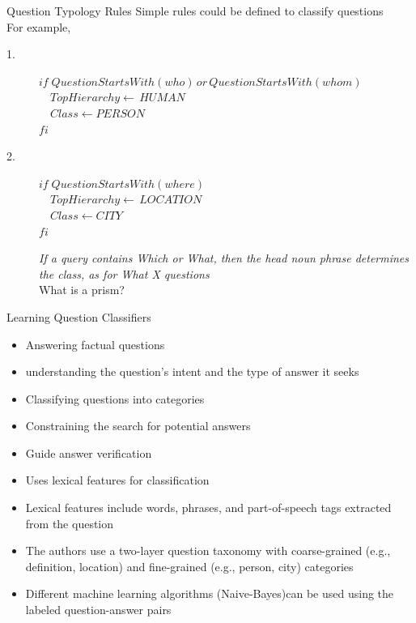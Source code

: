 \begin{frame}{Question Typology Rules}
Simple rules could be defined to classify questions\\
For example, \\
\begin{description}
	\item[1.] $if \;QuestionStartsWith(who) \,or\, QuestionStartsWith(whom)$\\
	$\quad TopHierarchy \leftarrow \, \textit{HUMAN}$\\
	$\quad Class \leftarrow \textit{PERSON}$\\
	$fi$
	\item[2.]$if\; QuestionStartsWith(where)$\\
	$\quad TopHierarchy \leftarrow \, \textit{LOCATION}$\\
	$\quad Class \leftarrow \textit{CITY}$\\
	$fi$\\


	\item[]\textit{If  a  query  contains Which or What,  then the  head  noun phrase determines the class, as for What X questions}\\
	What is a prism?
\end{description}
\end{frame}
\begin{frame}{Learning Question Classifiers}
\begin{multicols}{2}
        \begin{itemize}
            \item Answering factual questions\cite{li-roth-2002-learning}
            \item understanding the question's intent and the type of answer it seeks
            \item Classifying questions into categories
            \item Constraining the search for potential answers
            \item Guide answer verification
        \end{itemize}
\vfill\columnbreak
    \begin{itemize}
        \item Uses lexical features for classification
        \item [] Lexical features include words, phrases, and part-of-speech tags extracted from the question
        \item The authors use a two-layer question taxonomy with coarse-grained (e.g., definition, location) and fine-grained (e.g., person, city) categories
        \item Different machine learning algorithms (Naive-Bayes)can be used using the  labeled question-answer pairs
    \end{itemize}
    \end{multicols}
\end{frame}

